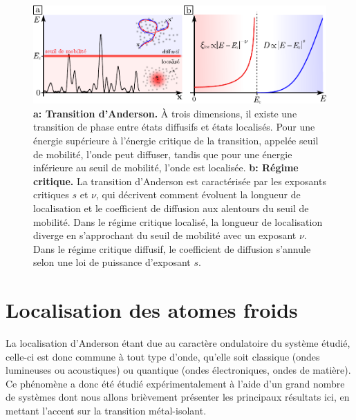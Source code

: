 \begin{figure}
\centering
\includegraphics[width=\textwidth]{Fig/Localisation/transition_anderson.pdf}
\caption{\textbf{a: Transition d'Anderson.} À trois dimensions, il existe une transition de phase entre états diffusifs et états localisés. Pour une énergie supérieure à l'énergie critique de la transition, appelée seuil de mobilité, l'onde peut diffuser, tandis que pour une énergie inférieure au seuil de mobilité, l'onde est localisée. \textbf{b: Régime critique.} La transition d'Anderson est caractérisée par les exposants critiques $s$ et $\nu$, qui décrivent comment évoluent la longueur de localisation et le coefficient de diffusion aux alentours du seuil de mobilité. Dans le régime critique localisé, la longueur de localisation diverge en s'approchant du seuil de mobilité avec un exposant $\nu$. Dans le régime critique diffusif, le coefficient de diffusion s'annule selon une loi de puissance d'exposant $s$. }
\label{fig:transition_anderson}
\end{figure}















\section{Localisation des atomes froids}
La localisation d'Anderson étant due au caractère ondulatoire du système étudié, celle-ci est donc commune à tout type d'onde, qu'elle soit classique (ondes lumineuses ou acoustiques) ou quantique (ondes électroniques, ondes de matière). Ce phénomène a donc été étudié expérimentalement à l'aide d'un grand nombre de systèmes dont nous allons brièvement présenter les principaux résultats ici, en mettant l'accent sur la transition métal-isolant.

